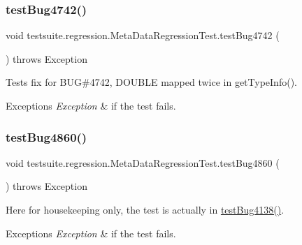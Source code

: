 \subsubsection{\texorpdfstring{test\+Bug4742()}{testBug4742()}}
{\footnotesize\ttfamily void testsuite.\+regression.\+Meta\+Data\+Regression\+Test.\+test\+Bug4742 (\begin{DoxyParamCaption}{ }\end{DoxyParamCaption}) throws Exception}

Tests fix for B\+UG\#4742, \textquotesingle{}D\+O\+U\+B\+LE\textquotesingle{} mapped twice in get\+Type\+Info().


\begin{DoxyExceptions}{Exceptions}
{\em Exception} & if the test fails. \\
\hline
\end{DoxyExceptions}
\mbox{\label{classtestsuite_1_1regression_1_1_meta_data_regression_test_a9c33a8fd6a670158feb2efa4cbf966ad}} 
\subsubsection{\texorpdfstring{test\+Bug4860()}{testBug4860()}}
{\footnotesize\ttfamily void testsuite.\+regression.\+Meta\+Data\+Regression\+Test.\+test\+Bug4860 (\begin{DoxyParamCaption}{ }\end{DoxyParamCaption}) throws Exception}

Here for housekeeping only, the test is actually in \mbox{\hyperlink{classtestsuite_1_1regression_1_1_meta_data_regression_test_a5c0ea954c7204a811055ea0487e75862}{test\+Bug4138()}}.


\begin{DoxyExceptions}{Exceptions}
{\em Exception} & if the test fails. \\
\hline
\end{DoxyExceptions}
\mbox{\label{classtestsuite_1_1regression_1_1_meta_data_regression_test_a5f79cbc323ee6b50a304811b962f4b37}} 
